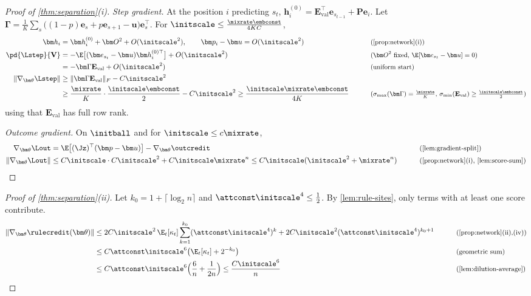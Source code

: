 \begin{proof}[Proof of \cref{thm:separation}(i)]
\emph{Step gradient.} At the position $i$ predicting $s_t$, $\bm h^{(0)}_i=\mathbf E_{\mathrm{val}}^\top\bm e_{s_{t-1}}+\mathbf P\bm e_i$. Let
$\bm\Gamma=\frac{1}{K}\sum_{s}\bigl((1-p)\bm e_s+p\bm e_{s+1}-\bm u\bigr)\bm e_s^\top$. For $\initscale\le\frac{\mixrate\embconst}{4KC}$,
\begin{alignat*}{2}
 \bm h_i&=\bm h^{(0)}_i+\bm O^2+O(\initscale^2),\qquad \bm p_i-\bm u=O(\initscale^2) &\qquad& \why{\cref{prop:network}(i)}\\
 \pd{\Lstep}{\mathbf V}&=-\E\bigl[(\bm e_{s_t}-\bm u)\bm h^{(0)\top}_i\bigr]+O(\initscale^2) && \why{$\bm O^2$ fixed, $\E[\bm e_{s_t}-\bm u]=0$}\\
 &=-\bm\Gamma\mathbf E_{\mathrm{val}}+O(\initscale^2) && \why{uniform start}\\
 \|\nabla_{\bm\theta}\Lstep\|&\ge\|\bm\Gamma\mathbf E_{\mathrm{val}}\|_F-C\initscale^2 && \\
 &\ge\frac{\mixrate}{K}\cdot\frac{\initscale\embconst}{2}-C\initscale^2\ge\frac{\initscale\mixrate\embconst}{4K} && \why{$\sigma_{\max}(\bm\Gamma)=\tfrac{\mixrate}{K}$, $\sigma_{\min}(\mathbf E_{\mathrm{val}})\ge\tfrac{\initscale\embconst}{2}$}
\end{alignat*}
using that $\mathbf E_{\mathrm{val}}$ has full row rank.

\emph{Outcome gradient.} On $\initball$ and for $\initscale\le c\mixrate$,
\begin{alignat}{2}
 \nabla_{\bm\theta}\Lout&=\E\bigl[(\Jz)^\top(\bm p-\bm u)\bigr]-\nabla_{\bm\theta}\outcredit &\qquad& \why{\cref{lem:gradient-split}}\nonumber\\
 \|\nabla_{\bm\theta}\Lout\|&\le C\initscale\cdot C\initscale^2+C\initscale\mixrate^n\le C\initscale(\initscale^2+\mixrate^n) && \why{\cref{prop:network}(i), \cref{lem:score-sum}}\label{eq:outcome-grad}
\end{alignat}
\end{proof}

\begin{proof}[Proof of \cref{thm:separation}(ii)]
Let $k_0=1+\lceil\log_2n\rceil$ and $\attconst\initscale^4\le\frac{1}{2}$. By \cref{lem:rule-sites}, only terms with at least one score contribute.
\begin{alignat*}{2}
 \|\nabla_{\bm\theta}\rulecredit(\bm\theta)\|
 &\le2C\initscale^2\,\E_t[\kappa_t]\sum_{k=1}^{k_0}(\attconst\initscale^4)^k+2C\initscale^2(\attconst\initscale^4)^{k_0+1} &\qquad& \why{\cref{prop:network}(ii),(iv)}\\
 &\le C\attconst\initscale^6\bigl(\E_t[\kappa_t]+2^{-k_0}\bigr) && \why{geometric sum}\\
 &\le C\attconst\initscale^6\Bigl(\frac{6}{n}+\frac{1}{2n}\Bigr)\le\frac{C\initscale^6}{n} && \why{\cref{lem:dilution-average}}\qedhere
\end{alignat*}
\end{proof}

